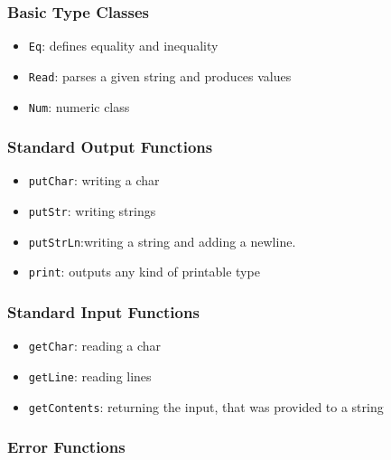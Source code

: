 \documentclass[a4paper, titlepage, twoside]{article}
\begin{document}
\subsubsection{Basic Type Classes}
\label{sec:org16109a6}

\begin{itemize}
\item \texttt{Eq}: defines equality and inequality

\item \texttt{Read}: parses a given string and produces values

\item \texttt{Num}: numeric class
\end{itemize}

\subsubsection{Standard Output Functions}
\label{sec:org87a4a46}

\begin{itemize}
\item \texttt{putChar}: writing a char

\item \texttt{putStr}: writing strings

\item \texttt{putStrLn}:writing a string and adding a newline.

\item \texttt{print}: outputs any kind of printable type
\end{itemize}

\subsubsection{Standard Input Functions}
\label{sec:orgbb7508e}

\begin{itemize}
\item \texttt{getChar}: reading a char

\item \texttt{getLine}: reading lines

\item \texttt{getContents}: returning the input, that was provided to a string
\end{itemize}

\subsubsection{Error Functions}
\label{sec:org96e84e2}
\end{document}
